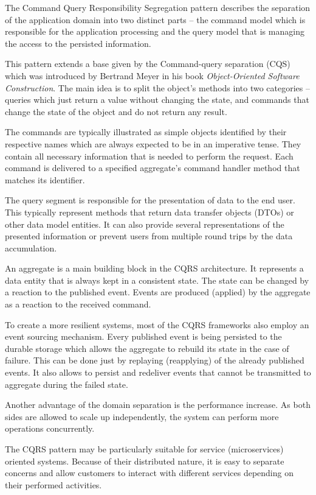 \documentclass[oneside,
  digital, %
  table,   %
  nolof,     %
  nolot,     %
]{fithesis3}
\begin{document}
The Command Query Responsibility Segregation pattern describes the separation of the application domain into two distinct parts -- the command model which is responsible for the application processing and the query model that is managing the access to the persisted information. 

This pattern extends a base given by the Command-query separation (CQS) which was introduced by Bertrand Meyer in his book \textit{Object-Oriented Software Construction}. The main idea is to split the object's methods into two categories -- queries which just return a value without changing the state, and commands that change the state of the object and do not return any result.

The commands are typically illustrated as simple objects identified by their respective names which are always expected to be in an imperative tense. They contain all necessary information that is needed to perform the request. Each command is delivered to a specified aggregate's command handler method that matches its identifier. 

The query segment is responsible for the presentation of data to the end user. This typically represent methods that return data transfer objects (DTOs) or other data model entities. It can also provide several representations of the presented information or prevent users from multiple round trips by the data accumulation.

An aggregate is a main building block in the CQRS architecture. It represents a data entity that is always kept in a consistent state. The state can be changed by a reaction to the published event. Events are produced (applied) by the aggregate as a reaction to the received command. 

To create a more resilient systems, most of the CQRS frameworks also employ an event sourcing mechanism. Every published event is being persisted to the durable storage which allows the aggregate to rebuild its state in the case of failure. This can be done just by replaying (reapplying) of the already published events. It also allows to persist and redeliver events that cannot be transmitted to aggregate during the failed state.

Another advantage of the domain separation is the performance increase. As both sides are allowed to scale up independently, the system can perform more operations concurrently.

The CQRS pattern may be particularly suitable for service (microservices) oriented systems. Because of their distributed nature, it is easy to separate concerns and allow customers to interact with different services depending on their performed activities.
\end{document}
